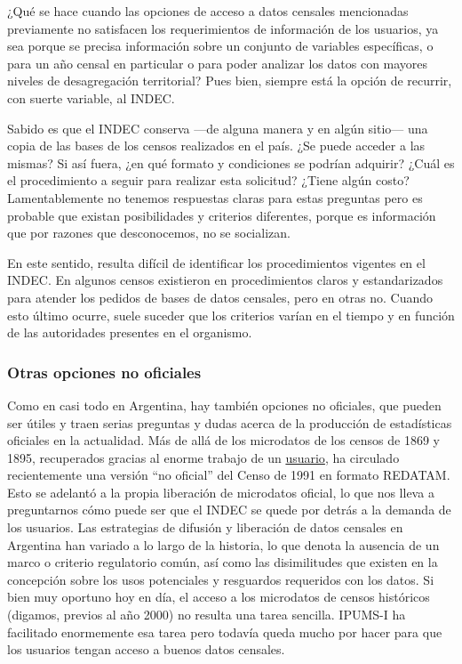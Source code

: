 \documentclass[
]{article}
\begin{document}
¿Qué se hace cuando las opciones de acceso a datos censales mencionadas previamente no satisfacen los requerimientos de información de los usuarios, ya sea porque se precisa información sobre un conjunto de variables específicas, o para un año censal en particular o para poder analizar los datos con mayores niveles de desagregación territorial? Pues bien, siempre está la opción de recurrir, con suerte variable, al INDEC.

Sabido es que el INDEC conserva ---de alguna manera y en algún sitio--- una copia de las bases de los censos realizados en el país. ¿Se puede acceder a las mismas? Si así fuera, ¿en qué formato y condiciones se podrían adquirir? ¿Cuál es el procedimiento a seguir para realizar esta solicitud? ¿Tiene algún costo? Lamentablemente no tenemos respuestas claras para estas preguntas pero es probable que existan posibilidades y criterios diferentes, porque es información que por razones que desconocemos, no se socializan.

En este sentido, resulta difícil de identificar los procedimientos vigentes en el INDEC. En algunos censos existieron en procedimientos claros y estandarizados para atender los pedidos de bases de datos censales, pero en otras no. Cuando esto último ocurre, suele suceder que los criterios varían en el tiempo y en función de las autoridades presentes en el organismo.

\hypertarget{otras-opciones-no-oficiales}{%
\subsubsection{Otras opciones no oficiales}\label{otras-opciones-no-oficiales}}

Como en casi todo en Argentina, hay también opciones no oficiales, que pueden ser útiles y traen serias preguntas y dudas acerca de la producción de estadísticas oficiales en la actualidad. Más de allá de los microdatos de los censos de 1869 y 1895, recuperados gracias al enorme trabajo de un \href{https://observatoriocensal.org/2015/12/01/recuperacion-de-microdatos-de-los-censos-argentinos-de-poblacion-1869-1895/}{usuario}, ha circulado recientemente una versión ``no oficial'' del Censo de 1991 en formato REDATAM. Esto se adelantó a la propia liberación de microdatos oficial, lo que nos lleva a preguntarnos cómo puede ser que el INDEC se quede por detrás a la demanda de los usuarios. Las estrategias de difusión y liberación de datos censales en Argentina han variado a lo largo de la historia, lo que denota la ausencia de un marco o criterio regulatorio común, así como las disimilitudes que existen en la concepción sobre los usos potenciales y resguardos requeridos con los datos. Si bien muy oportuno hoy en día, el acceso a los microdatos de censos históricos (digamos, previos al año 2000) no resulta una tarea sencilla. IPUMS-I ha facilitado enormemente esa tarea pero todavía queda mucho por hacer para que los usuarios tengan acceso a buenos datos censales.
\end{document}
